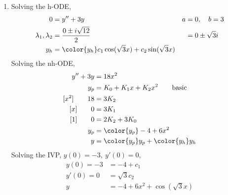 \begin{enumerate}
    \item Solving the h-ODE,
          \begin{align}
              0                        & = y'' + 3y                         &
              a                        & = 0, \quad b = 3                     \\
              \lambda_{1}, \lambda_{2} & = \frac{0 \pm i\sqrt{12}}{2}       &
                                       & = 0 \pm \sqrt{3}i                    \\
              y_{h}                    & = \color{y_h} c_{1}\cos(\sqrt{3}x)
              + c_{2}\sin(\sqrt{3}x)
          \end{align}
          Solving the nh-ODE,
          \begin{align}
              y'' + 3y          & = 18x^{2}                                         \\
              y_{p}             & = K_{0} + K_{1}x + K_{2}x^{2} \qquad \text{basic} \\
              [x^{2}] \qquad 18 & = 3K_{2}                                          \\
              [x] \qquad 0      & = 3K_{1}                                          \\
              [1] \qquad 0      & = 2K_{2} + 3K_{0}                                 \\
              y_{p}             & = \color{y_p} -4 + 6x^{2}                         \\
              y                 & = {\color{y_p} y_{p}} + {\color{y_h} y_{h}}
          \end{align}
          Solving the IVP, $ y(0) = -3,\ y'(0) = 0 $,
          \begin{align}
              y(0) = -3 & = -4 + c_{1}                    \\
              y'(0) = 0 & =\sqrt{3}c_{2}                  \\
              y         & = -4 + 6x^{2} + \cos(\sqrt{3}x)
          \end{align}


\end{enumerate}

